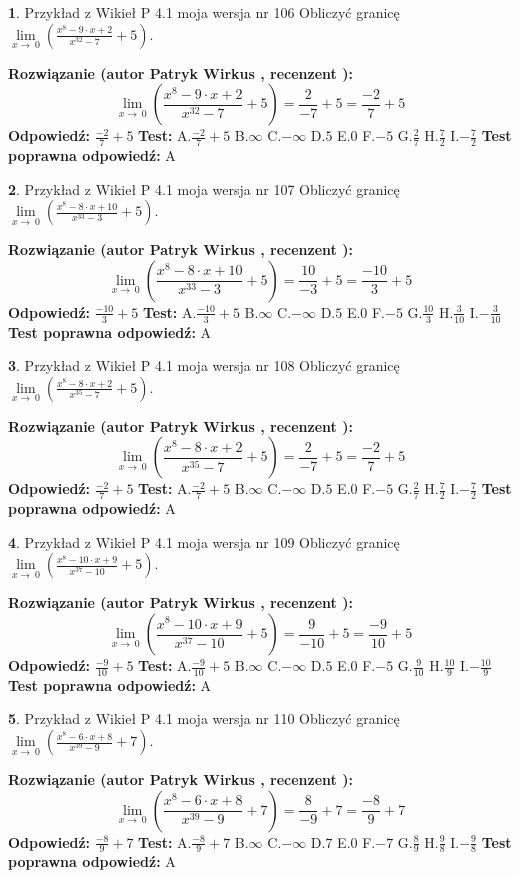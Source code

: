 \documentclass[12pt, a4paper]{article}
\theoremstyle{definition} %
\newtheorem{zad}{}
\newcommand{\zadStart}[1]{\begin{zad}#1\newline}
\newcommand{\zadStop}{\end{zad}}
\newcommand{\rozwStart}[2]{\noindent \textbf{Rozwiązanie (autor #1 , recenzent #2): }\newline}
\newcommand{\rozwStop}{\newline}
\newcommand{\odpStart}{\noindent \textbf{Odpowiedź:}\newline}
\newcommand{\odpStop}{\newline}
\newcommand{\testStart}{\noindent \textbf{Test:}\newline}
\newcommand{\testStop}{\newline}
\newcommand{\kluczStart}{\noindent \textbf{Test poprawna odpowiedź:}\newline}
\newcommand{\kluczStop}{\newline}
\begin{document}
\zadStart{Przykład z Wikieł P 4.1 moja wersja nr 106}
Obliczyć granicę $\lim\limits_{x\to\ 0}(\frac{x^{8}-9 \cdot x +2}{x^{32}-7}+5)$.
\zadStop
\rozwStart{Patryk Wirkus}{}
$$\lim\limits_{x\to\ 0}(\frac{x^{8}-9 \cdot x +2}{x^{32}-7}+5)=\frac{2}{-7}+5=\frac{-2}{7}+5$$
\rozwStop
\odpStart
$\frac{-2}{7}+5$
\odpStop
\testStart
A.$\frac{-2}{7}+5$
B.$\infty$
C.$-\infty$
D.$5$
E.$0$
F.$-5$
G.$\frac{2}{7}$
H.$\frac{7}{2}$
I.$-\frac{7}{2}$
\testStop
\kluczStart
A
\kluczStop



\zadStart{Przykład z Wikieł P 4.1 moja wersja nr 107}
Obliczyć granicę $\lim\limits_{x\to\ 0}(\frac{x^{8}-8 \cdot x +10}{x^{33}-3}+5)$.
\zadStop
\rozwStart{Patryk Wirkus}{}
$$\lim\limits_{x\to\ 0}(\frac{x^{8}-8 \cdot x +10}{x^{33}-3}+5)=\frac{10}{-3}+5=\frac{-10}{3}+5$$
\rozwStop
\odpStart
$\frac{-10}{3}+5$
\odpStop
\testStart
A.$\frac{-10}{3}+5$
B.$\infty$
C.$-\infty$
D.$5$
E.$0$
F.$-5$
G.$\frac{10}{3}$
H.$\frac{3}{10}$
I.$-\frac{3}{10}$
\testStop
\kluczStart
A
\kluczStop



\zadStart{Przykład z Wikieł P 4.1 moja wersja nr 108}
Obliczyć granicę $\lim\limits_{x\to\ 0}(\frac{x^{8}-8 \cdot x +2}{x^{35}-7}+5)$.
\zadStop
\rozwStart{Patryk Wirkus}{}
$$\lim\limits_{x\to\ 0}(\frac{x^{8}-8 \cdot x +2}{x^{35}-7}+5)=\frac{2}{-7}+5=\frac{-2}{7}+5$$
\rozwStop
\odpStart
$\frac{-2}{7}+5$
\odpStop
\testStart
A.$\frac{-2}{7}+5$
B.$\infty$
C.$-\infty$
D.$5$
E.$0$
F.$-5$
G.$\frac{2}{7}$
H.$\frac{7}{2}$
I.$-\frac{7}{2}$
\testStop
\kluczStart
A
\kluczStop



\zadStart{Przykład z Wikieł P 4.1 moja wersja nr 109}
Obliczyć granicę $\lim\limits_{x\to\ 0}(\frac{x^{8}-10 \cdot x +9}{x^{37}-10}+5)$.
\zadStop
\rozwStart{Patryk Wirkus}{}
$$\lim\limits_{x\to\ 0}(\frac{x^{8}-10 \cdot x +9}{x^{37}-10}+5)=\frac{9}{-10}+5=\frac{-9}{10}+5$$
\rozwStop
\odpStart
$\frac{-9}{10}+5$
\odpStop
\testStart
A.$\frac{-9}{10}+5$
B.$\infty$
C.$-\infty$
D.$5$
E.$0$
F.$-5$
G.$\frac{9}{10}$
H.$\frac{10}{9}$
I.$-\frac{10}{9}$
\testStop
\kluczStart
A
\kluczStop



\zadStart{Przykład z Wikieł P 4.1 moja wersja nr 110}
Obliczyć granicę $\lim\limits_{x\to\ 0}(\frac{x^{8}-6 \cdot x +8}{x^{39}-9}+7)$.
\zadStop
\rozwStart{Patryk Wirkus}{}
$$\lim\limits_{x\to\ 0}(\frac{x^{8}-6 \cdot x +8}{x^{39}-9}+7)=\frac{8}{-9}+7=\frac{-8}{9}+7$$
\rozwStop
\odpStart
$\frac{-8}{9}+7$
\odpStop
\testStart
A.$\frac{-8}{9}+7$
B.$\infty$
C.$-\infty$
D.$7$
E.$0$
F.$-7$
G.$\frac{8}{9}$
H.$\frac{9}{8}$
I.$-\frac{9}{8}$
\testStop
\kluczStart
A
\kluczStop
\end{document}
